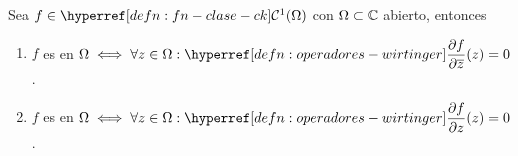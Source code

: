 \begin{prop}\label{prop:fn-holomorfa-iff-wirtinger}
    Sea $f \in \exhyperref[defn:fn-clase-ck]{fn-clase-ck}{\mathcal{C}^1}(\Omega)$ con $\Omega \subset \mathbb{C}$ abierto, entonces
    \begin{enumerate}
        \item $f$ es  en $\ds \Omega \iff \forall z \in \Omega : \exhyperref[defn:operadores-wirtinger]{operadores-wirtinger}{\pdv{f}{\bar{z}}}(z) = 0$.
        \item $f$ es  en $\ds \Omega \iff \forall z \in \Omega : \exhyperref[defn:operadores-wirtinger]{operadores-wirtinger}{\pdv{f}{z}}(z) = 0$.
    \end{enumerate}
\end{prop}
